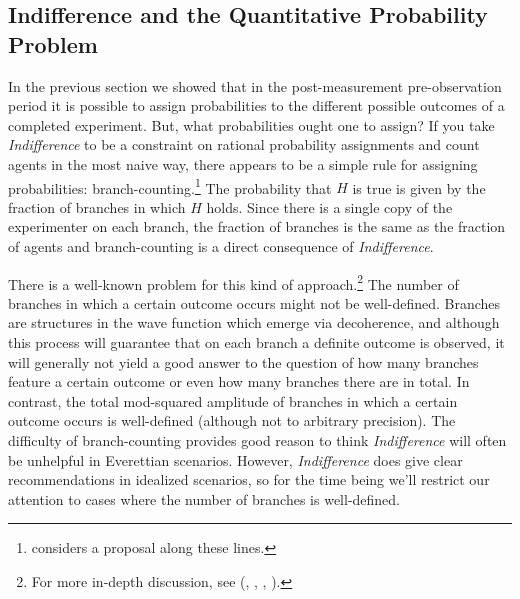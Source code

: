\documentclass[onecolumn,secnumarabic,amsmath,amssymb,balancelastpage,nofootinbib]{article}
\begin{document}
\subsection{Indifference and the Quantitative Probability Problem}\label{quant}

In the previous section we showed that in the post-measurement pre-observation period it is possible to assign probabilities to the different possible outcomes of a completed experiment.  But, what probabilities ought one to assign?  If you take \emph{Indifference} to be a constraint on rational probability assignments and count agents in the most naive way, there appears to be a simple rule for assigning probabilities: branch-counting.\footnote{\citet{lewis2009} considers a proposal along these lines.}  The probability that $H$ is true is given by the fraction of branches in which $H$ holds.  Since there is a single copy of the experimenter on each branch, the fraction of branches is the same as the fraction of agents and branch-counting is a direct consequence of \emph{Indifference}.

There is a well-known problem for this kind of approach.\footnote{For more in-depth discussion, see \citeauthor{wallace2007} (\citeyear{wallace2007}, , \citeyear{wallace2012}, ).}  The number of branches in which a certain outcome occurs might not be well-defined.  Branches are structures in the wave function which emerge via decoherence, and although this process will guarantee that on each branch a definite outcome is observed, it will generally not yield a good answer to the question of how many branches feature a certain outcome or even how many branches there are in total.  In contrast, the total mod-squared amplitude of branches in which a certain outcome occurs is well-defined (although not to arbitrary precision).  The difficulty of branch-counting provides good reason to think \emph{Indifference} will often be unhelpful in Everettian scenarios.  However, \emph{Indifference} does give clear recommendations in idealized scenarios, so for the time being we'll restrict our attention to cases where the number of branches is well-defined.
\end{document}
